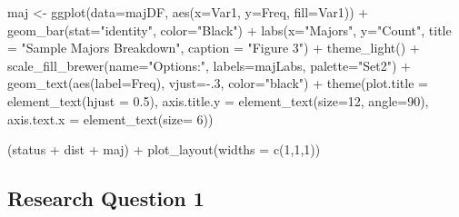 \documentclass[
  letterpaper,
  DIV=11,
  numbers=noendperiod]{scrartcl}
\newenvironment{Shaded}{\begin{snugshade}}{\end{snugshade}}
\newcommand{\AttributeTok}[1]{\textcolor[rgb]{0.40,0.45,0.13}{#1}}
\newcommand{\DecValTok}[1]{\textcolor[rgb]{0.68,0.00,0.00}{#1}}
\newcommand{\FloatTok}[1]{\textcolor[rgb]{0.68,0.00,0.00}{#1}}
\newcommand{\FunctionTok}[1]{\textcolor[rgb]{0.28,0.35,0.67}{#1}}
\newcommand{\NormalTok}[1]{\textcolor[rgb]{0.00,0.23,0.31}{#1}}
\newcommand{\OtherTok}[1]{\textcolor[rgb]{0.00,0.23,0.31}{#1}}
\newcommand{\SpecialCharTok}[1]{\textcolor[rgb]{0.37,0.37,0.37}{#1}}
\newcommand{\StringTok}[1]{\textcolor[rgb]{0.13,0.47,0.30}{#1}}
\begin{document}
\begin{Shaded}
\begin{Highlighting}[]
\NormalTok{maj }\OtherTok{\textless{}{-}} \FunctionTok{ggplot}\NormalTok{(}\AttributeTok{data=}\NormalTok{majDF, }\FunctionTok{aes}\NormalTok{(}\AttributeTok{x=}\NormalTok{Var1, }\AttributeTok{y=}\NormalTok{Freq, }\AttributeTok{fill=}\NormalTok{Var1)) }\SpecialCharTok{+} 
  \FunctionTok{geom\_bar}\NormalTok{(}\AttributeTok{stat=}\StringTok{"identity"}\NormalTok{, }\AttributeTok{color=}\StringTok{"Black"}\NormalTok{) }\SpecialCharTok{+} 
  \FunctionTok{labs}\NormalTok{(}\AttributeTok{x=}\StringTok{"Majors"}\NormalTok{, }\AttributeTok{y=}\StringTok{"Count"}\NormalTok{, }\AttributeTok{title =} \StringTok{"Sample Majors Breakdown"}\NormalTok{, }
       \AttributeTok{caption =} \StringTok{"Figure 3"}\NormalTok{) }\SpecialCharTok{+} 
  \FunctionTok{theme\_light}\NormalTok{() }\SpecialCharTok{+} 
  \FunctionTok{scale\_fill\_brewer}\NormalTok{(}\AttributeTok{name=}\StringTok{"Options:"}\NormalTok{, }\AttributeTok{labels=}\NormalTok{majLabs, }\AttributeTok{palette=}\StringTok{"Set2"}\NormalTok{) }\SpecialCharTok{+} 
  \FunctionTok{geom\_text}\NormalTok{(}\FunctionTok{aes}\NormalTok{(}\AttributeTok{label=}\NormalTok{Freq), }\AttributeTok{vjust=}\SpecialCharTok{{-}}\NormalTok{.}\DecValTok{3}\NormalTok{, }\AttributeTok{color=}\StringTok{"black"}\NormalTok{) }\SpecialCharTok{+} 
  \FunctionTok{theme}\NormalTok{(}\AttributeTok{plot.title =} \FunctionTok{element\_text}\NormalTok{(}\AttributeTok{hjust =} \FloatTok{0.5}\NormalTok{),}
        \AttributeTok{axis.title.y =} \FunctionTok{element\_text}\NormalTok{(}\AttributeTok{size=}\DecValTok{12}\NormalTok{, }\AttributeTok{angle=}\DecValTok{90}\NormalTok{), }
        \AttributeTok{axis.text.x =} \FunctionTok{element\_text}\NormalTok{(}\AttributeTok{size=} \DecValTok{6}\NormalTok{))}

\NormalTok{(status }\SpecialCharTok{+}\NormalTok{ dist }\SpecialCharTok{+}\NormalTok{  maj) }\SpecialCharTok{+} \FunctionTok{plot\_layout}\NormalTok{(}\AttributeTok{widths =} \FunctionTok{c}\NormalTok{(}\DecValTok{1}\NormalTok{,}\DecValTok{1}\NormalTok{,}\DecValTok{1}\NormalTok{))}
\end{Highlighting}
\end{Shaded}

\subsection{Research Question 1}\label{research-question-1}
\end{document}
